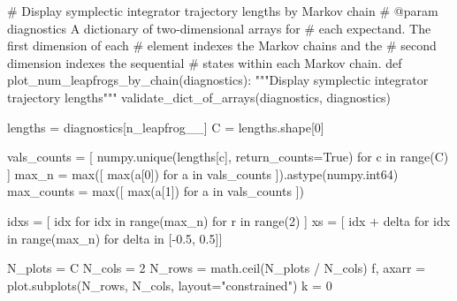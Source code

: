 \documentclass[
  letterpaper,
  DIV=11,
  numbers=noendperiod]{scrartcl}
\newenvironment{Shaded}{\begin{snugshade}}{\end{snugshade}}
\newcommand{\BuiltInTok}[1]{\textcolor[rgb]{0.00,0.23,0.31}{#1}}
\newcommand{\CommentTok}[1]{\textcolor[rgb]{0.37,0.37,0.37}{#1}}
\newcommand{\ControlFlowTok}[1]{\textcolor[rgb]{0.00,0.23,0.31}{#1}}
\newcommand{\DecValTok}[1]{\textcolor[rgb]{0.68,0.00,0.00}{#1}}
\newcommand{\FloatTok}[1]{\textcolor[rgb]{0.68,0.00,0.00}{#1}}
\newcommand{\KeywordTok}[1]{\textcolor[rgb]{0.00,0.23,0.31}{#1}}
\newcommand{\NormalTok}[1]{\textcolor[rgb]{0.00,0.23,0.31}{#1}}
\newcommand{\OperatorTok}[1]{\textcolor[rgb]{0.37,0.37,0.37}{#1}}
\newcommand{\StringTok}[1]{\textcolor[rgb]{0.13,0.47,0.30}{#1}}
\newcommand{\VariableTok}[1]{\textcolor[rgb]{0.07,0.07,0.07}{#1}}
\begin{document}
\begin{Shaded}
\begin{Highlighting}[]
\CommentTok{\# Display symplectic integrator trajectory lengths by Markov chain}
\CommentTok{\# @param diagnostics A dictionary of two{-}dimensional arrays for}
\CommentTok{\#                    each expectand.  The first dimension of each}
\CommentTok{\#                    element indexes the Markov chains and the}
\CommentTok{\#                    second dimension indexes the sequential}
\CommentTok{\#                    states within each Markov chain.}
\KeywordTok{def}\NormalTok{ plot\_num\_leapfrogs\_by\_chain(diagnostics):}
  \CommentTok{"""Display symplectic integrator trajectory lengths"""}
\NormalTok{  validate\_dict\_of\_arrays(diagnostics, }\StringTok{\textquotesingle{}diagnostics\textquotesingle{}}\NormalTok{)}

\NormalTok{  lengths }\OperatorTok{=}\NormalTok{ diagnostics[}\StringTok{\textquotesingle{}n\_leapfrog\_\_\textquotesingle{}}\NormalTok{]}
\NormalTok{  C }\OperatorTok{=}\NormalTok{ lengths.shape[}\DecValTok{0}\NormalTok{]}
  
\NormalTok{  vals\_counts }\OperatorTok{=}\NormalTok{ [ numpy.unique(lengths[c], return\_counts}\OperatorTok{=}\VariableTok{True}\NormalTok{) }
                  \ControlFlowTok{for}\NormalTok{ c }\KeywordTok{in} \BuiltInTok{range}\NormalTok{(C) ] }
\NormalTok{  max\_n }\OperatorTok{=} \BuiltInTok{max}\NormalTok{([ }\BuiltInTok{max}\NormalTok{(a[}\DecValTok{0}\NormalTok{]) }\ControlFlowTok{for}\NormalTok{ a }\KeywordTok{in}\NormalTok{ vals\_counts ]).astype(numpy.int64)}
\NormalTok{  max\_counts }\OperatorTok{=} \BuiltInTok{max}\NormalTok{([ }\BuiltInTok{max}\NormalTok{(a[}\DecValTok{1}\NormalTok{]) }\ControlFlowTok{for}\NormalTok{ a }\KeywordTok{in}\NormalTok{ vals\_counts ])}
  
\NormalTok{  idxs }\OperatorTok{=}\NormalTok{ [ idx }\ControlFlowTok{for}\NormalTok{ idx }\KeywordTok{in} \BuiltInTok{range}\NormalTok{(max\_n) }\ControlFlowTok{for}\NormalTok{ r }\KeywordTok{in} \BuiltInTok{range}\NormalTok{(}\DecValTok{2}\NormalTok{) ]}
\NormalTok{  xs }\OperatorTok{=}\NormalTok{ [ idx }\OperatorTok{+}\NormalTok{ delta }\ControlFlowTok{for}\NormalTok{ idx }\KeywordTok{in} \BuiltInTok{range}\NormalTok{(max\_n) }\ControlFlowTok{for}\NormalTok{ delta }\KeywordTok{in}\NormalTok{ [}\OperatorTok{{-}}\FloatTok{0.5}\NormalTok{, }\FloatTok{0.5}\NormalTok{]]}
  
\NormalTok{  N\_plots }\OperatorTok{=}\NormalTok{ C}
\NormalTok{  N\_cols }\OperatorTok{=} \DecValTok{2}
\NormalTok{  N\_rows }\OperatorTok{=}\NormalTok{ math.ceil(N\_plots }\OperatorTok{/}\NormalTok{ N\_cols)}
\NormalTok{  f, axarr }\OperatorTok{=}\NormalTok{ plot.subplots(N\_rows, N\_cols, layout}\OperatorTok{=}\StringTok{"constrained"}\NormalTok{)}
\NormalTok{  k }\OperatorTok{=} \DecValTok{0}
  

\end{Highlighting}
\end{Shaded}
\end{document}
